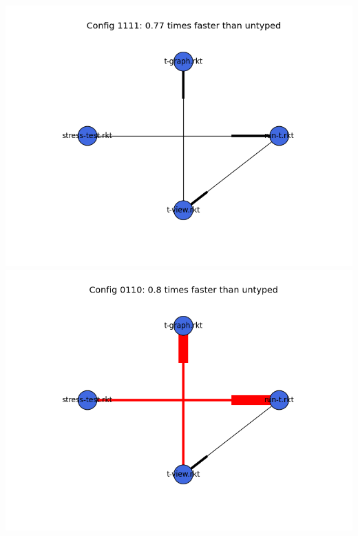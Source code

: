 \documentclass{article}
\begin{document}
\begin{itemize}
\includegraphics[width=\textwidth]{mbta-2015-03-26-module-graph-1111.png}
\includegraphics[width=\textwidth]{mbta-2015-03-26-module-graph-0110.png}
\end{itemize}
\end{document}
